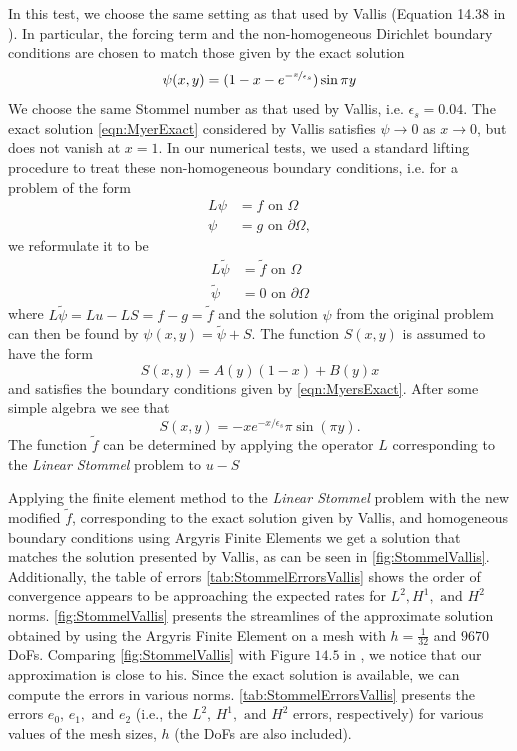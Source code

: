 In this test, we choose the same setting as that used by Vallis (Equation 14.38 in \cite{Vallis06}).
In particular, the forcing term and the non-homogeneous Dirichlet boundary conditions are chosen to
match those given by the exact solution
\begin{equation}
  \psi(x,y) = (1-x-e^{-\nicefrac{x}{\epsilon_s}}) \sin \pi y
  \label{eqn:MyerExact}
\end{equation}
We choose the same Stommel number as that used by Vallis, i.e. $\epsilon_s=0.04$. The exact solution
\eqref{eqn:MyerExact} considered by Vallis satisfies $\psi \to 0$ as $x \to 0$, but does not vanish
at $x=1$. In our numerical tests, we used a standard lifting procedure to treat these
non-homogeneous boundary conditions, i.e. for a problem of the form
\begin{align*}
  L \psi&=f \text{ on } \Omega\\
  \psi &=g \text{ on } \partial \Omega,
\end{align*}
we reformulate it to be 
\begin{align*}
  L\tilde{\psi} &= \tilde{f} \text{ on } \Omega \\
  \tilde{\psi} &= 0 \text{ on } \partial \Omega
\end{align*}
where $L\tilde{\psi} = Lu - LS = f - g = \tilde{f}$ and the solution $\psi$ from the original problem can then be found
by $\psi(x,y) =\tilde{\psi}+S$. The function $S(x,y)$ is assumed to have the form 
\begin{equation*}
  S(x,y) = A(y) (1-x) + B(y) x
\end{equation*}
and satisfies the boundary conditions given by \eqref{eqn:MyersExact}. After some simple algebra we see that 
\begin{equation*}
  S(x,y) = -x e^{-x/\epsilon_s}\pi \sin(\pi y).
\end{equation*}
The function $\tilde{f}$ can be determined by applying the operator $L$ corresponding to the \emph{Linear Stommel}
problem to $u - S$ 

Applying the finite element method to the \emph{Linear Stommel} problem with the new modified $\tilde{f}$, corresponding
to the exact solution given by Vallis, and homogeneous boundary conditions using Argyris Finite Elements we get a
solution that matches the solution presented by Vallis, as can be seen in \autoref{fig:StommelVallis}. Additionally,
the table of errors \autoref{tab:StommelErrorsVallis} shows the order of convergence appears to be approaching the expected
rates for $L^2, H^1, \text{ and } H^2$ norms. 
\autoref{fig:StommelVallis} presents the streamlines of the approximate solution obtained by using
the Argyris Finite Element on a mesh with $h=\frac{1}{32}$ and $9670$ DoFs. Comparing
\autoref{fig:StommelVallis} with Figure $14.5$ in \cite{Vallis06}, we notice that our approximation
is close to his. Since the exact solution is available, we can compute the errors in various norms.
\autoref{tab:StommelErrorsVallis} presents the errors $e_0,\, e_1, \text{ and } e_2$ (i.e., the
$L^2,\, H^1, \text{ and } H^2$ errors, respectively) for various values of the mesh sizes, $h$ (the
DoFs are also included).

